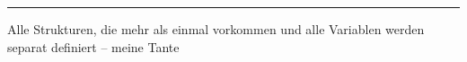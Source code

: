 \begin{frame}
	
	\pause \vspace{1em}
	
	\pause
	
	\pause \hrule\vspace{1em}
	\glqq Alle Strukturen, die mehr als einmal vorkommen und alle Variablen werden separat definiert\grqq{} -- meine Tante

\end{frame}

